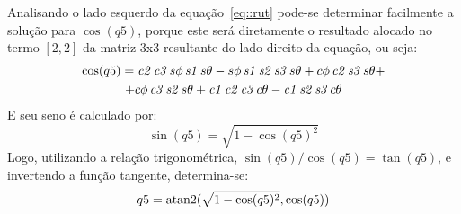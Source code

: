 Analisando o lado esquerdo da equação~\ref{eq::rut} pode-se determinar
facilmente a solução para $\cos(q5)$, porque este será diretamente o resultado
alocado no termo $[2,2]$ da matriz 3x3 resultante do lado direito da equação, ou
seja:
%
\begin{multline}
\cos(q5) = {\it c2}\,{\it c3}\,s\phi \,{\it s1}\,s\theta -s\phi \,{\it s1}\,{\it 
		s2}\,{\it s3}\,s\theta +c\phi \,{\it c2}\,{\it s3}\,s\theta +
		\\ +c\phi \,{\it c3}\,{\it s2}\,s\theta +{\it c1}\,{\it c2}\,{\it c3}\,c\theta -{
		\it c1}\,{\it s2}\,{\it s3}\,c\theta 
\end{multline}
%
E seu seno é calculado por:
%
\begin{equation}
	\sin(q5) = \sqrt{1-\cos(q5)^2}
\end{equation}
%
Logo, utilizando a relação trigonométrica, $\sin(q5)/\cos(q5) = \tan(q5)$,
e invertendo a função tangente, determina-se:
%
\begin{equation}
	q5 = \operatorname{atan2}(\sqrt{1-\cos(q5)^2}, \cos(q5))
\end{equation}
%


